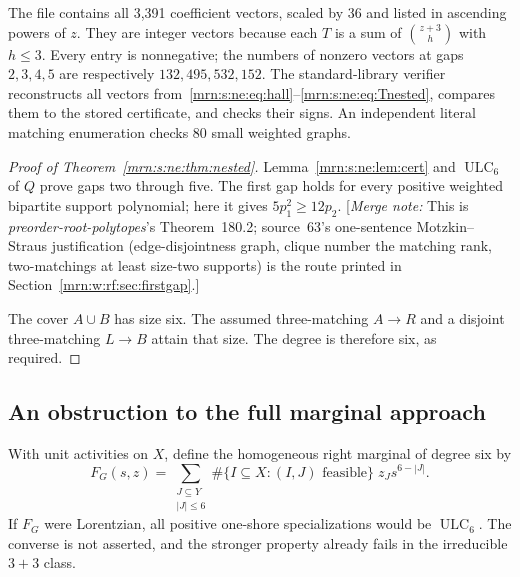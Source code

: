 \documentclass[11pt,a4paper]{article}
\theoremstyle{remark}\newtheorem{remark}[theorem]{Remark}
\newcommand{\ULC}{\operatorname{ULC}}      %
\newcommand{\mnote}[1]{[\textit{Merge note:} #1]}
\newcommand{\prp}{\emph{preorder-root-polytopes}}
\begin{document}
The file  contains all 3,391 coefficient vectors, scaled by 36 and listed in ascending powers of $z$. They are integer vectors because each $T$ is a sum of $\binom{z+3}{h}$ with $h\le3$. Every entry is nonnegative; the numbers of nonzero vectors at gaps $2,3,4,5$ are respectively $132,495,532,152$. The standard-library verifier reconstructs all vectors from~\eqref{mrn:s:ne:eq:hall}--\eqref{mrn:s:ne:eq:Tnested}, compares them to the stored certificate, and checks their signs. An independent literal matching enumeration checks 80 small weighted graphs.

\begin{proof}[Proof of Theorem~\ref{mrn:s:ne:thm:nested}]
Lemma~\ref{mrn:s:ne:lem:cert} and $\ULC_6$ of $Q$ prove gaps two through five. The first gap holds for every positive weighted bipartite support polynomial; here it gives $5p_1^2\ge12p_2$. \mnote{This is \prp's Theorem~180.2; source~63's one-sentence Motzkin--Straus justification (edge-disjointness graph, clique number the matching rank, two-matchings at least size-two supports) is the route printed in Section~\ref{mrn:w:rf:sec:firstgap}.}

The cover $A\cup B$ has size six. The assumed three-matching $A\to R$ and a disjoint three-matching $L\to B$ attain that size. The degree is therefore six, as required.
\end{proof}

\subsection{An obstruction to the full marginal approach}
With unit activities on $X$, define the homogeneous right marginal of degree six by
\[
 F_G(s,z)=\sum_{\substack{J\subseteq Y\\|J|\le6}}
 \#\{I\subseteq X:(I,J)\text{ feasible}\}\;z_Js^{6-|J|}.
\]
If $F_G$ were Lorentzian, all positive one-shore specializations would be $\ULC_6$. The converse is not asserted, and the stronger property already fails in the irreducible $3+3$ class.
\end{document}
